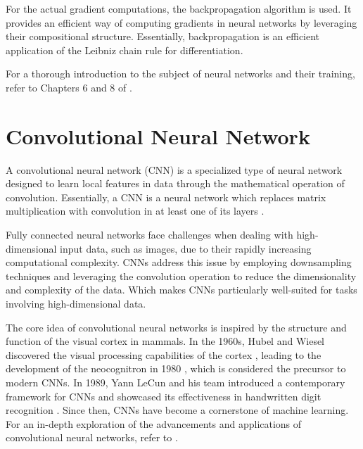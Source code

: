 \documentclass[../../thesis.tex]{subfiles}
\begin{document}
For the actual gradient computations, the backpropagation algorithm is used. It provides an efficient way of computing gradients in neural networks by leveraging their compositional structure. Essentially, backpropagation is an efficient application of the Leibniz chain rule for differentiation.\newline

For a thorough introduction to the subject of neural networks and their training, refer to Chapters 6 and 8 of \cite{deeplearningbook}.


\section{Convolutional Neural Network}

A convolutional neural network (CNN) is a specialized type of neural network designed to learn local features in data through the mathematical operation of convolution. Essentially, a CNN is a neural network which replaces matrix multiplication with convolution in at least one of its layers \cite{deeplearningbook}. \newline

Fully connected neural networks face challenges when dealing with high-dimensional input data, such as images, due to their rapidly increasing computational complexity. CNNs address this issue by employing downsampling techniques and leveraging the convolution operation to reduce the dimensionality and complexity of the data. Which makes CNNs particularly well-suited for tasks involving high-dimensional data.\newline

The core idea of convolutional neural networks is inspired by the structure and function of the visual cortex in mammals. In the 1960s, Hubel and Wiesel discovered the visual processing capabilities of the cortex \cite{https://doi.org/10.1113/jphysiol.1968.sp008455}, leading to the development of the neocognitron in 1980 \cite{6313076}, which is considered the precursor to modern CNNs. In 1989, Yann LeCun and his team introduced a contemporary framework for CNNs and showcased its effectiveness in handwritten digit recognition \cite{LeCun1989ConvNet}. Since then, CNNs have become a cornerstone of machine learning. For an in-depth exploration of the advancements and applications of convolutional neural networks, refer to \cite{gu2017recent}.
\end{document}
